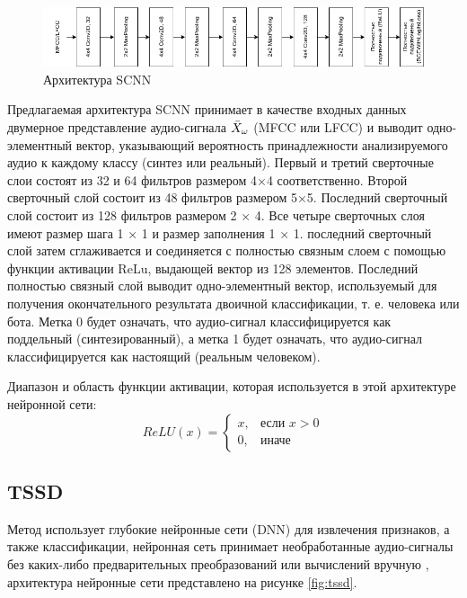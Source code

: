\begin{figure}[H]
	\centering
	\includegraphics[width=1\linewidth]{images/SCNN.png}
	\caption{Архитектура SCNN}
	\label{fig:scnn}
\end{figure}

Предлагаемая архитектура  SCNN принимает в качестве входных данных двумерное представление аудио-сигнала \(\Bar{X}_\omega\) (MFCC или LFCC) и выводит одно-элементный вектор, указывающий вероятность принадлежности анализируемого аудио к каждому классу (синтез или реальный). Первый и третий сверточные слои состоят из 32 и 64 фильтров размером 4×4 соответственно. Второй сверточный слой состоит из 48 фильтров размером 5×5. Последний сверточный слой состоит из 128 фильтров размером 2 × 4. Все четыре сверточных слоя имеют размер шага 1 × 1 и размер заполнения 1 × 1. последний сверточный слой затем сглаживается и соединяется с полностью связным слоем с помощью функции активации ReLu, выдающей вектор из 128 элементов. Последний полностью связный слой выводит одно-элементный вектор, используемый для получения окончательного результата двоичной классификации, т. е. человека или бота. Метка 0 будет означать, что аудио-сигнал классифицируется как поддельный (синтезированный), а метка 1 будет означать, что аудио-сигнал классифицируется как настоящий (реальным человеком).

Диапазон и область функции активации, которая используется в этой архитектуре нейронной сети:
\begin{equation}
    ReLU(x) = \begin{cases}
    x, & \text{если } x > 0 \\
    0, & \text{иначе}
\end{cases}
\end{equation}


\subsection{TSSD}

Метод использует глубокие нейронные сети (DNN) для извлечения признаков, а также классификации, нейронная сеть принимает необработанные аудио-сигналы без каких-либо предварительных преобразований или вычислений вручную \cite{svdnn}, архитектура нейронные сети представлено на рисунке \ref{fig:tssd}.

